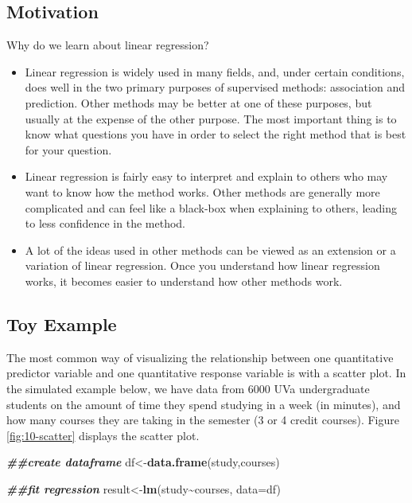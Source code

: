 \documentclass[
]{book}
\newenvironment{Shaded}{\begin{snugshade}}{\end{snugshade}}
\newcommand{\AttributeTok}[1]{\textcolor[rgb]{0.13,0.29,0.53}{#1}}
\newcommand{\DocumentationTok}[1]{\textcolor[rgb]{0.56,0.35,0.01}{\textbf{\textit{#1}}}}
\newcommand{\FunctionTok}[1]{\textcolor[rgb]{0.13,0.29,0.53}{\textbf{#1}}}
\newcommand{\NormalTok}[1]{#1}
\newcommand{\OtherTok}[1]{\textcolor[rgb]{0.56,0.35,0.01}{#1}}
\newcommand{\SpecialCharTok}[1]{\textcolor[rgb]{0.81,0.36,0.00}{\textbf{#1}}}
\begin{document}
\subsection{Motivation}\label{motivation}

Why do we learn about linear regression?

\begin{itemize}
\item
  Linear regression is widely used in many fields, and, under certain conditions, does well in the two primary purposes of supervised methods: association and prediction. Other methods may be better at one of these purposes, but usually at the expense of the other purpose. The most important thing is to know what questions you have in order to select the right method that is best for your question.
\item
  Linear regression is fairly easy to interpret and explain to others who may want to know how the method works. Other methods are generally more complicated and can feel like a black-box when explaining to others, leading to less confidence in the method.
\item
  A lot of the ideas used in other methods can be viewed as an extension or a variation of linear regression. Once you understand how linear regression works, it becomes easier to understand how other methods work.
\end{itemize}

\subsection{Toy Example}\label{toy-example}

The most common way of visualizing the relationship between one quantitative predictor variable and one quantitative response variable is with a scatter plot. In the simulated example below, we have data from 6000 UVa undergraduate students on the amount of time they spend studying in a week (in minutes), and how many courses they are taking in the semester (3 or 4 credit courses). Figure \ref{fig:10-scatter} displays the scatter plot.

\begin{Shaded}
\begin{Highlighting}[]
\DocumentationTok{\#\#create dataframe}
\NormalTok{df}\OtherTok{\textless{}{-}}\FunctionTok{data.frame}\NormalTok{(study,courses)}

\DocumentationTok{\#\#fit regression}
\NormalTok{result}\OtherTok{\textless{}{-}}\FunctionTok{lm}\NormalTok{(study}\SpecialCharTok{\textasciitilde{}}\NormalTok{courses, }\AttributeTok{data=}\NormalTok{df)}
\end{Highlighting}
\end{Shaded}
\end{document}
